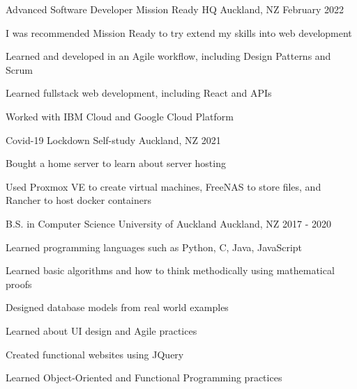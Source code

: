 

\begin{cventries}

  \cventry
    {Advanced Software Developer}
    {Mission Ready HQ}
    {Auckland, NZ}
    {February 2022}
    {
      \begin{cvitems}
        \item {I was recommended Mission Ready to try extend my skills into web development}
        \item {Learned and developed in an Agile workflow, including Design Patterns and Scrum}
        \item {Learned fullstack web development, including React and APIs}
        \item {Worked with IBM Cloud and Google Cloud Platform}
      \end{cvitems}
    }

  \cventry
    {Covid-19 Lockdown}
    {Self-study}
    {Auckland, NZ}
    {2021}
    {
      \begin{cvitems}
        \item {Bought a home server to learn about server hosting}
        \item {Used Proxmox VE to create virtual machines, FreeNAS to store files, and Rancher to host docker containers}
      \end{cvitems}
    }

  \cventry
    {B.S. in Computer Science} %
    {University of Auckland} %
    {Auckland, NZ} %
    {2017 - 2020} %
    {
      \begin{cvitems} %
        \item {Learned programming languages such as Python, C, Java, JavaScript}
        \item {Learned basic algorithms and how to think methodically using mathematical proofs}
        \item {Designed database models from real world examples}
        \item {Learned about UI design and Agile practices}
        \item {Created functional websites using JQuery}
        \item {Learned Object-Oriented and Functional Programming practices}
      \end{cvitems}
    }

\end{cventries}
